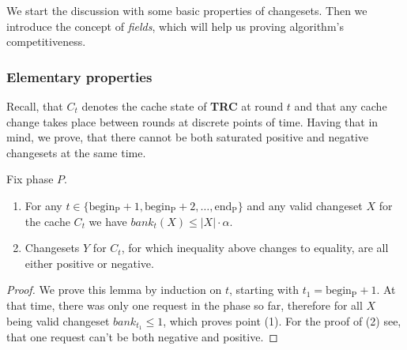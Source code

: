 We start the discussion with some basic properties of changesets. Then we
introduce the concept of \textit{fields}, which will help us proving algorithm's
competitiveness.

\subsubsection{Elementary properties} Recall, that $C_t$ denotes the cache state
of \textbf{TRC} at round $t$ and that any cache change takes place between
rounds at discrete points of time.  Having that in mind, we prove, that there
cannot be both saturated positive and negative changesets at the same time.
\begin{lemma} \label{thm:lemma1} Fix phase $P$.
\begin{enumerate}[label=(\arabic*)] \item For any $t \in \{\mathrm{begin_P} +1,
\mathrm{begin_P} + 2, \ldots, \mathrm{end_P}\}$ and any valid changeset $X$ for
the cache $C_t$ we have $bank_t(X) \leq |X| \cdot \alpha$.  \item Changesets $Y$
for $C_t$, for which inequality above changes to equality, are all either
positive or negative.  \end{enumerate} \end{lemma} \begin{proof} We prove this
lemma by induction on $t$, starting with $t_1 = \mathrm{begin_P} +1$. At that
time, there was only one request in the phase so far, therefore for all $X$
being valid changeset $bank_{t_1} \leq 1$, which proves point (1). For the proof
of (2) see, that one request can't be both negative and positive.


\end{proof}
